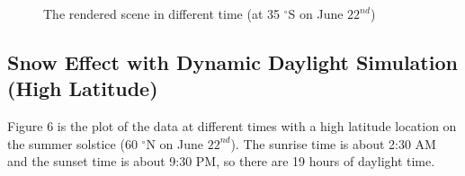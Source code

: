 \documentclass{article}
\begin{document}
\begin{figure}[h]

  \caption{The rendered scene in different time (at 35 $^{\circ}$S on June \(22^{nd}\))}
  \label{fig:L35S}
\end{figure}

\subsection {Snow Effect with Dynamic Daylight Simulation (High Latitude)}

Figure 6 is the plot of the data at different times with a high latitude location on the summer solstice (60 $^{\circ}$N on June 
\(22^{nd}\)). The sunrise time is about 2:30 AM and the sunset time is about 9:30 PM, so there are 19 hours of daylight time.
\end{document}
